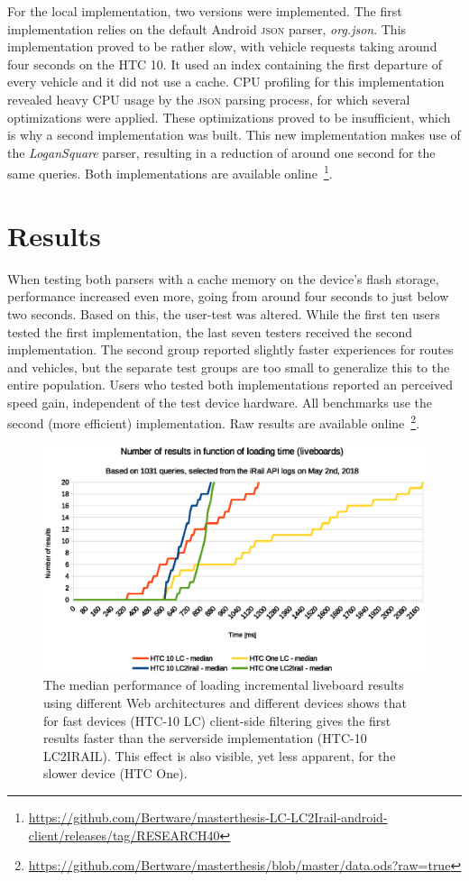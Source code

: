 \documentclass[twocolumn]{phdsymp} %
\begin{document}
For the local implementation, two versions were implemented. The first implementation relies on the default Android \textsc{json} parser, \emph{org.json}. This implementation proved to be rather slow, with vehicle requests taking around four seconds on the HTC 10. It used an index containing the first departure of every vehicle and it did not use a cache. CPU profiling for this implementation revealed heavy CPU usage by the \textsc{json} parsing process, for which several optimizations were applied. These optimizations proved to be insufficient, which is why a second implementation was built. This new implementation makes use of the \emph{LoganSquare} parser, resulting in a reduction of around one second for the same queries. Both implementations are available online~\footnote{\url{https://github.com/Bertware/masterthesis-LC-LC2Irail-android-client/releases/tag/RESEARCH40}}.

\section{Results}

When testing both parsers with a cache memory on the device’s flash storage, performance increased even more, going from around four seconds to just below two seconds. Based on this, the user-test was altered. While the first ten users tested the first implementation, the last seven testers received the second implementation. The second group reported slightly faster experiences for routes and vehicles, but the separate test groups are too small to generalize this to the entire population. Users who tested both implementations reported an perceived speed gain, independent of the test device hardware. All benchmarks use the second (more efficient) implementation. Raw results are available online~\footnote{\url{https://github.com/Bertware/masterthesis/blob/master/data.ods?raw=true}}.


\begin{figure}[ht]
	\begin{center}
		\includegraphics[width=.50\textwidth]{images/dief_liveboards_average.eps}
		\caption{\label{fig:liveboard} The median performance of loading incremental liveboard results using different Web architectures and different devices shows that for fast devices (HTC-10 LC) client-side filtering gives the first results faster than the serverside implementation (HTC-10 LC2IRAIL). This effect is also visible, yet less apparent, for the slower device (HTC One).}
	\end{center}
\end{figure}
\end{document}
